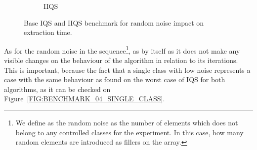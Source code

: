 \begin{figure}
\begin{subfigure}[b]{0.45\textwidth}
        \caption{IIQS}
        \label{FIG:BENCHMARK_05_CLASSES__0_1}
    \end{subfigure}

    \caption{Base IQS and IIQS benchmark for random noise impact on extraction time.}
    \label{FIG:BENCHMARK_05_CLASSES}
\end{figure}

As for the random noise in the sequence\footnote{We define as the random noise as the number of elements which does not belong to any controlled classes for the experiment. In this case, how many random elements are introduced as fillers on the array.}, as by itself as it does not make any visible changes on the behaviour of the algorithm in relation to its iterations. This is important, because the fact that a single class with low noise represents a case with the same behaviour as found on the worst case of IQS for both algorithms, as it can be checked on Figure~\ref{FIG:BENCHMARK_04_SINGLE_CLASS}.\\


